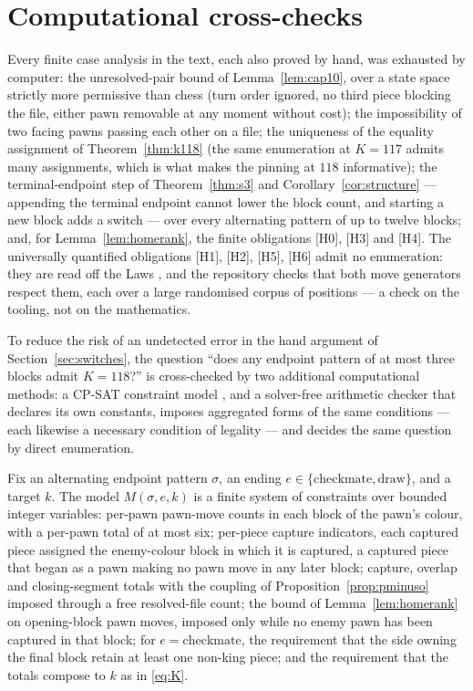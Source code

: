 \documentclass[11pt]{article}
\theoremstyle{definition}
\theoremstyle{remark}
\theoremstyle{plain}
\begin{document}
\section{Computational cross-checks}\label{app:crosschecks}

Every finite case analysis in the text, each also proved by hand, was
exhausted by computer: the unresolved-pair bound of
Lemma~\ref{lem:cap10}, over a state space strictly more permissive than
chess (turn order ignored, no third piece blocking the file, either pawn
removable at any moment without cost); the impossibility of two facing
pawns passing each other on a file; the uniqueness of the equality
assignment of Theorem~\ref{thm:k118} (the same enumeration at $K = 117$
admits many assignments, which is what makes the pinning at $118$
informative); the terminal-endpoint step of Theorem~\ref{thm:s3} and
Corollary~\ref{cor:structure} --- appending the terminal endpoint
cannot lower the block count, and starting a new block adds a switch
--- over every alternating pattern of up to twelve blocks; and, for
Lemma~\ref{lem:homerank}, the finite obligations [H0], [H3] and [H4].
The universally quantified obligations [H1], [H2], [H5], [H6] admit no
enumeration: they are read off the Laws \cite{fide2023laws}, and the
repository checks that both move generators respect them, each over a
large randomised corpus of positions --- a check on the tooling, not
on the mathematics.

To reduce the risk of an undetected error in the hand argument of
Section~\ref{sec:switches}, the question ``does any endpoint pattern of
at most three blocks admit $K = 118$?'' is cross-checked by two
additional computational methods: a CP-SAT constraint model \cite{ortools}, and a solver-free
arithmetic checker that declares its own constants, imposes aggregated
forms of the same conditions --- each likewise a necessary condition of
legality --- and decides the same question by direct enumeration.

Fix an alternating endpoint pattern $\sigma$, an ending
$e \in \{\text{checkmate}, \text{draw}\}$, and a target $k$. The model
$M(\sigma, e, k)$ is a finite system of constraints over bounded integer
variables: per-pawn pawn-move counts in each block of the pawn's colour,
with a per-pawn total of at most six; per-piece capture indicators, each
captured piece assigned the enemy-colour block in which it is captured, a
captured piece that began as a pawn making no pawn move in any later
block; capture, overlap
and closing-segment totals with the coupling of Proposition~\ref{prop:pminuso} imposed through
a free resolved-file count; the bound of Lemma~\ref{lem:homerank} on
opening-block pawn moves, imposed only while no enemy pawn has been
captured in that block; for $e = \text{checkmate}$, the requirement that
the side owning the final block retain at least one non-king piece; and the
requirement that the totals compose to $k$ as in \eqref{eq:K}.
\end{document}
